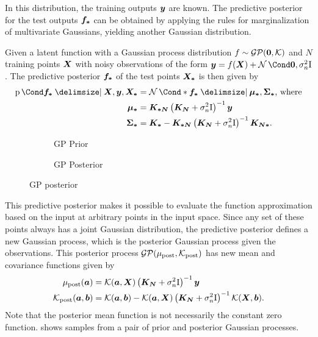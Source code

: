 In this distribution, the training outputs $\bm{y}$ are known.
The predictive posterior for the test outputs $\bm{f_\ast}$ can be obtained by applying the rules for marginalization of multivariate Gaussians, yielding another Gaussian distribution.
\begin{lemma}
    \label{lem:gp_posterior}
    Given a latent function with a Gaussian process distribution $f \sim \operatorname{\mathcal{GP}}(\bm{0}, \operatorname{\mathcal{K}})$ and $N$ training points $\bm{X}$ with noisy observations of the form $\mat{y} = f(\mat{X}) + \Gaussian{\mat{0}, \sigma_n^2 \Eye}$.
    The predictive posterior $\bm{f_\ast}$ of the test points $\bm{X_\ast}$ is then given by
    \begin{align}
        \Prob{\mat{f_\ast} \given \mat{X}, \mat{y}, \mat{X_\ast}} &= \Gaussian*{\mat{f_\ast} \given \mat{\mu_\ast}, \mat{\Sigma_\ast}} \text{, where} \\
        \mat{\mu_\ast} &= \mat{K_{\ast N}} \left( \mat{K_N} + \sigma_n^2 \Eye \right)^{-1} \mat{y} \\
        \mat{\Sigma_\ast} &= \mat{K_\ast} - \mat{K_{\ast N}} \left( \mat{K_N} + \sigma_n^2 \Eye \right)^{-1} \mat{K_{N\ast}}.
    \end{align}
\end{lemma}
\begin{figure}[tb]
    \centering
    \begin{subfigure}{\subfigurewidth}
        \caption{GP Prior}
        \label{fig:gp_posterior:prior}
    \end{subfigure}
    \begin{subfigure}{\subfigurewidth}
        \caption{GP Posterior}
        \label{fig:gp_posterior:posterior}
    \end{subfigure}
    \caption{GP posterior}
    \label{fig:gp_posterior}
\end{figure}

This predictive posterior makes it possible to evaluate the function approximation based on the input at arbitrary points in the input space.
Since any set of these points always has a joint Gaussian distribution, the predictive posterior defines a new Gaussian process, which is the posterior Gaussian process given the observations.
This posterior process $\operatorname{\mathcal{GP}}(\mu_\text{post}, \operatorname{\mathcal{K}}_\text{post})$ has new mean and covariance functions given by
\begin{align}
    \mu_\text{post}(\bm{a}) &= \operatorname{\mathcal{K}}(\bm{a}, \bm{X}) \left(\bm{K_N} + \sigma_n^2 \mathrm{I} \right)^{-1} \bm{y} \\
    \operatorname{\mathcal{K}}_\text{post}(\bm{a}, \bm{b}) &= \operatorname{\mathcal{K}}(\bm{a}, \bm{b}) - \operatorname{\mathcal{K}}(\bm{a}, \bm{X}) \left( \bm{K_N} + \sigma_n^2 \mathrm{I} \right)^{-1} \operatorname{\mathcal{K}}(\bm{X}, \bm{b}).
\end{align}
Note that the posterior mean function is not necessarily the constant zero function.
 shows samples from a pair of prior and posterior Gaussian processes.

